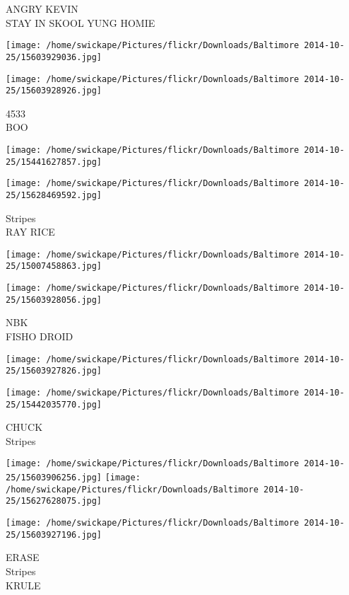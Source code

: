 \documentclass[10pt,letterpaper]{article}
\begin{document}
ANGRY KEVIN\\
STAY IN SKOOL YUNG HOMIE
\pagebreak

\texttt{[image: /home/swickape/Pictures/flickr/Downloads/Baltimore 2014-10-25/15603929036.jpg]}

\vspace{0.25in}
\texttt{[image: /home/swickape/Pictures/flickr/Downloads/Baltimore 2014-10-25/15603928926.jpg]}

4533\\
BOO
\pagebreak

\texttt{[image: /home/swickape/Pictures/flickr/Downloads/Baltimore 2014-10-25/15441627857.jpg]}

\vspace{0.25in}
\texttt{[image: /home/swickape/Pictures/flickr/Downloads/Baltimore 2014-10-25/15628469592.jpg]}

Stripes\\
RAY RICE
\pagebreak

\texttt{[image: /home/swickape/Pictures/flickr/Downloads/Baltimore 2014-10-25/15007458863.jpg]}

\vspace{0.25in}
\texttt{[image: /home/swickape/Pictures/flickr/Downloads/Baltimore 2014-10-25/15603928056.jpg]}

NBK\\
FISHO DROID
\pagebreak

\texttt{[image: /home/swickape/Pictures/flickr/Downloads/Baltimore 2014-10-25/15603927826.jpg]}

\vspace{0.25in}
\texttt{[image: /home/swickape/Pictures/flickr/Downloads/Baltimore 2014-10-25/15442035770.jpg]}

CHUCK\\
Stripes
\pagebreak

\texttt{[image: /home/swickape/Pictures/flickr/Downloads/Baltimore 2014-10-25/15603906256.jpg]}
\texttt{[image: /home/swickape/Pictures/flickr/Downloads/Baltimore 2014-10-25/15627628075.jpg]}

\vspace{0.25in}
\texttt{[image: /home/swickape/Pictures/flickr/Downloads/Baltimore 2014-10-25/15603927196.jpg]}

ERASE\\
Stripes\\
KRULE
\pagebreak
\end{document}
